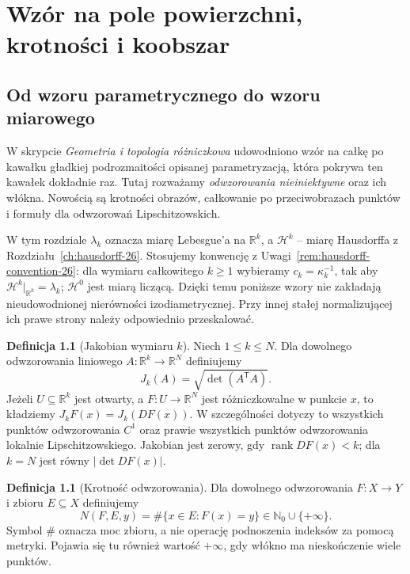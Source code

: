 \documentclass[11pt,a4paper,oneside]{book}
\numberwithin{equation}{chapter}
\theoremstyle{plain}
\theoremstyle{definition}
\newtheorem{definicja}[twierdzenie]{Definicja}
\theoremstyle{remark}
\begin{document}
\chapter{Wzór na pole powierzchni, krotności i koobszar}
\label{ch:area-coarea-28}

\section{Od wzoru parametrycznego do wzoru miarowego}
W skrypcie \emph{Geometria i topologia różniczkowa}
udowodniono wzór na całkę po kawałku gładkiej
podrozmaitości opisanej parametryzacją, która
pokrywa ten kawałek dokładnie raz. Tutaj rozważamy
\emph{odwzorowania nieiniektywne} oraz ich włókna.
Nowością są krotności obrazów, całkowanie po
przeciwobrazach punktów i formuły dla
odwzorowań Lipschitzowskich.

W tym rozdziale $\lambda_k$ oznacza miarę Lebesgue'a
na $\mathbb R^k$, a $\mathcal H^k$ -- miarę
Hausdorffa z Rozdziału~\ref{ch:hausdorff-26}.
Stosujemy konwencję z
Uwagi~\ref{rem:hausdorff-convention-26}: dla wymiaru
całkowitego $k\ge1$ wybieramy $c_k=\kappa_k^{-1}$,
tak aby $\mathcal H^k|_{\mathbb R^k}=\lambda_k$;
$\mathcal H^0$ jest miarą liczącą.
Dzięki temu poniższe wzory nie zakładają
nieudowodnionej nierówności izodiametrycznej.
Przy innej stałej normalizującej ich prawe strony
należy odpowiednio przeskalować.

\begin{definicja}[Jakobian wymiaru $k$]
\label{def:k-jacobian-28}
Niech $1\le k\le N$. Dla dowolnego odwzorowania
liniowego $A:\mathbb R^k\to\mathbb R^N$ definiujemy
\[
 J_k(A)=\sqrt{\det(A^{\mathsf T}A)}.
\]
Jeżeli $U\subseteq\mathbb R^k$ jest otwarty,
a $F:U\to\mathbb R^N$ jest różniczkowalne
w punkcie $x$, to kładziemy $J_kF(x)=J_k(DF(x))$.
W szczególności dotyczy to wszystkich punktów odwzorowania
$C^1$ oraz prawie wszystkich punktów odwzorowania
lokalnie Lipschitzowskiego. Jakobian jest zerowy,
gdy $\operatorname{rank}DF(x)<k$; dla $k=N$
jest równy $|\det DF(x)|$.
\end{definicja}

\begin{definicja}[Krotność odwzorowania]
\label{def:multiplicity-28}
Dla dowolnego odwzorowania $F:X\to Y$
i zbioru $E\subseteq X$ definiujemy
\[
 N(F,E,y)=\#\{x\in E:F(x)=y\}\in\mathbb N_0\cup\{+\infty\}.
\]
Symbol $\#$ oznacza moc zbioru, a nie operację
podnoszenia indeksów za pomocą metryki.
Pojawia się tu również wartość $+\infty$,
gdy włókno ma nieskończenie wiele punktów.
\end{definicja}
\end{document}
